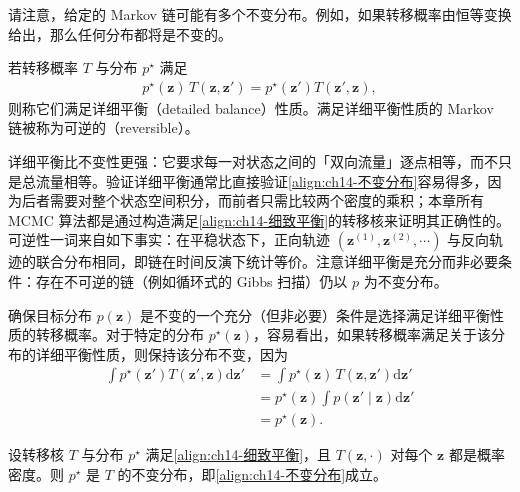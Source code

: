 \documentclass[../../main.tex]{subfiles}
\begin{document}
请注意，给定的 Markov 链可能有多个不变分布。例如，如果转移概率由恒等变换给出，那么任何分布都将是不变的。

\begin{definition}[详细平衡]\label{definition:ch14-详细平衡}
若转移概率 $T$ 与分布 $p^{\star}$ 满足
\begin{align}
p^{\star}(\bm{z})\,T\!\left(\bm{z},\bm{z}'\right)=p^{\star}\!\left(\bm{z}'\right)T\!\left(\bm{z}',\bm{z}\right),
\label{align:ch14-细致平衡}
\end{align}
则称它们满足详细平衡（detailed balance）性质。满足详细平衡性质的 Markov 链被称为可逆的（reversible）。
\end{definition}

\begin{remark}详细平衡比不变性更强：它要求每一对状态之间的「双向流量」逐点相等，而不只是总流量相等。验证详细平衡通常比直接验证\eqref{align:ch14-不变分布}容易得多，因为后者需要对整个状态空间积分，而前者只需比较两个密度的乘积；本章所有 MCMC 算法都是通过构造满足\eqref{align:ch14-细致平衡}的转移核来证明其正确性的。可逆性一词来自如下事实：在平稳状态下，正向轨迹 $\left(\bm{z}^{(1)},\bm{z}^{(2)},\cdots\right)$ 与反向轨迹的联合分布相同，即链在时间反演下统计等价。注意详细平衡是充分而非必要条件：存在不可逆的链（例如循环式的 Gibbs 扫描）仍以 $p$ 为不变分布。
\end{remark}

确保目标分布 $p(\bm{z})$ 是不变的一个充分（但非必要）条件是选择满足详细平衡性质的转移概率。对于特定的分布 $p^{\star}(\bm{z})$，容易看出，如果转移概率满足关于该分布的详细平衡性质，则保持该分布不变，因为
\begin{align}
\int p^{\star}\!\left(\bm{z}'\right)T\!\left(\bm{z}',\bm{z}\right)\mathrm{d}\bm{z}'&=\int p^{\star}(\bm{z})\,T\!\left(\bm{z},\bm{z}'\right)\mathrm{d}\bm{z}'\nonumber\\
&=p^{\star}(\bm{z})\int p\!\left(\bm{z}'\mid\bm{z}\right)\mathrm{d}\bm{z}'\nonumber\\
&=p^{\star}(\bm{z}).
\label{align:ch14-细致平衡推导}
\end{align}

\begin{proposition}[详细平衡蕴含不变性]\label{proposition:ch14-细致平衡蕴含不变}
设转移核 $T$ 与分布 $p^{\star}$ 满足\eqref{align:ch14-细致平衡}，且 $T\!\left(\bm{z},\cdot\right)$ 对每个 $\bm{z}$ 都是概率密度。则 $p^{\star}$ 是 $T$ 的不变分布，即\eqref{align:ch14-不变分布}成立。
\end{proposition}
\end{document}

